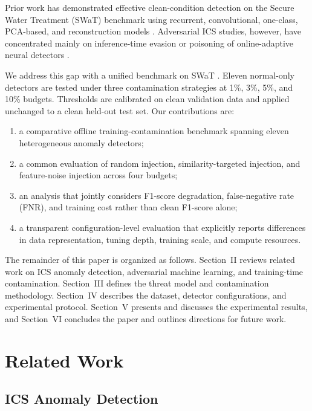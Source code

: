 \documentclass[10pt,conference]{IEEEtran}
\begin{document}
Prior work has demonstrated effective clean-condition detection on the Secure Water Treatment (SWaT) benchmark using recurrent, convolutional, one-class, PCA-based, and reconstruction models \cite{goh2017rnn,kravchik2018cnn,inoue2017unsupervised,kim2020seq2seq,kravchik2022lightweight}. Adversarial ICS studies, however, have concentrated mainly on inference-time evasion \cite{zizzo2020adversarial,10.1145/3427228.3427660,anthi2021adversarial} or poisoning of online-adaptive neural detectors \cite{kravchik2021poisoning,kravchik2022practical}.

We address this gap with a unified benchmark on SWaT \cite{mathur2016swat,goh2017dataset}. Eleven normal-only detectors are tested under three contamination strategies at 1\%, 3\%, 5\%, and 10\% budgets. Thresholds are calibrated on clean validation data and applied unchanged to a clean held-out test set. Our contributions are:
\begin{enumerate}
    \item a comparative offline training-contamination benchmark spanning eleven heterogeneous anomaly detectors;
    \item a common evaluation of random injection, similarity-targeted injection, and feature-noise injection across four budgets;
    \item an analysis that jointly considers F1-score degradation, false-negative rate (FNR), and training cost rather than clean F1-score alone;
    \item a transparent configuration-level evaluation that explicitly reports differences in data representation, tuning depth, training scale, and compute resources.
\end{enumerate}

The remainder of this paper is organized as follows. Section~II reviews related work on ICS anomaly detection, adversarial machine learning, and training-time contamination. Section~III defines the threat model and contamination methodology. Section~IV describes the dataset, detector configurations, and experimental protocol. Section~V presents and discusses the experimental results, and Section~VI concludes the paper and outlines directions for future work.

\section{Related Work}

\subsection{ICS Anomaly Detection}
\end{document}
